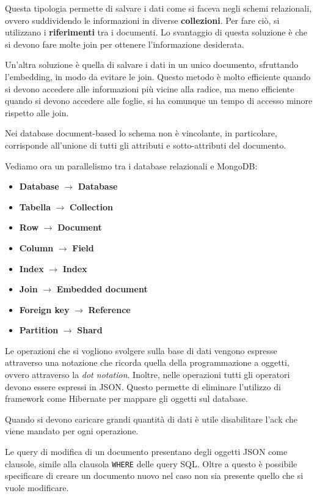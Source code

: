 Questa tipologia permette di salvare i dati come si faceva negli schemi relazionali,
ovvero suddividendo le informazioni in diverse \textbf{collezioni}. Per fare ciò,
si utilizzano i \textbf{riferimenti} tra i documenti. Lo svantaggio di questa
soluzione è che si devono fare molte join per ottenere l'informazione desiderata.

Un'altra soluzione è quella di salvare i dati in un unico documento, sfruttando
l'embedding, in modo da evitare le join. Questo metodo è molto efficiente quando
si devono accedere alle informazioni più vicine alla radice, ma meno efficiente
quando si devono accedere alle foglie, si ha comunque un tempo di accesso minore
rispetto alle join.

Nei database document-based lo schema non è vincolante, in particolare, corrisponde
all'unione di tutti gli attributi e sotto-attributi del documento.

Vediamo ora un parallelismo tra i database relazionali e MongoDB:
\begin{itemize}
      \item \textbf{Database} $\rightarrow$ \textbf{Database}
      \item \textbf{Tabella} $\rightarrow$ \textbf{Collection}
      \item \textbf{Row} $\rightarrow$ \textbf{Document}
      \item \textbf{Column} $\rightarrow$ \textbf{Field}
      \item \textbf{Index} $\rightarrow$ \textbf{Index}
      \item \textbf{Join} $\rightarrow$ \textbf{Embedded document}
      \item \textbf{Foreign key} $\rightarrow$ \textbf{Reference}
      \item \textbf{Partition} $\rightarrow$ \textbf{Shard}
\end{itemize}
Le operazioni che si vogliono svolgere sulla base di dati vengono espresse
attraverso una notazione che ricorda quella della programmazione a oggetti, ovvero
attraverso la \textit{dot notation}. Inoltre, nelle operazioni tutti gli
operatori devono essere espressi in JSON. Questo permette di eliminare l'utilizzo
di framework come Hibernate per mappare gli oggetti sul database.
\begin{nota}
      Quando si devono caricare grandi quantità di dati è utile disabilitare
      l'ack che viene mandato per ogni operazione.
\end{nota}
Le query di modifica di un documento presentano degli oggetti JSON come
clausole, simile alla clausola \texttt{WHERE} delle query SQL. Oltre a questo
è possibile specificare di creare un documento nuovo nel caso non sia presente
quello che si vuole modificare.

